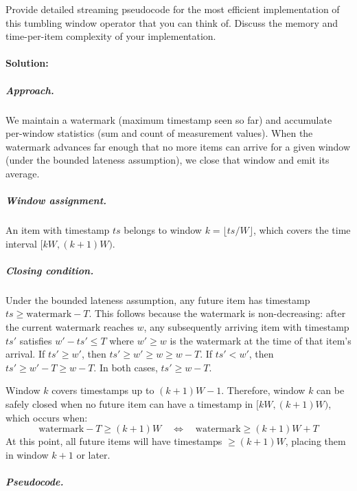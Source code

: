 \documentclass[11pt]{article}
\theoremstyle{definition}
\newcommand{\ts}{\mathit{ts}}
\begin{document}
Provide detailed streaming pseudocode for the most efficient implementation of this tumbling window operator that you can think of. Discuss the memory and time-per-item complexity of your implementation.

\paragraph{Solution:}

\subparagraph{Approach.} We maintain a watermark (maximum timestamp seen so far) and accumulate per-window statistics (sum and count of measurement values). When the watermark advances far enough that no more items can arrive for a given window (under the bounded lateness assumption), we close that window and emit its average.

\subparagraph{Window assignment.} An item with timestamp $\ts$ belongs to window $k = \lfloor \ts / W \rfloor$, which covers the time interval $[kW, (k+1)W)$.

\subparagraph{Closing condition.} Under the bounded lateness assumption, any future item has timestamp $\ts \geq \text{watermark} - T$. This follows because the watermark is non-decreasing: after the current watermark reaches $w$, any subsequently arriving item with timestamp $\ts'$ satisfies $w' - \ts' \leq T$ where $w' \geq w$ is the watermark at the time of that item's arrival. If $\ts' \geq w'$, then $\ts' \geq w' \geq w \geq w - T$. If $\ts' < w'$, then $\ts' \geq w' - T \geq w - T$. In both cases, $\ts' \geq w - T$.

Window $k$ covers timestamps up to $(k+1)W - 1$. Therefore, window $k$ can be safely closed when no future item can have a timestamp in $[kW, (k+1)W)$, which occurs when:
\[
	\text{watermark} - T \geq (k+1)W \quad \Longleftrightarrow \quad \text{watermark} \geq (k+1)W + T
\]
At this point, all future items will have timestamps $\geq (k+1)W$, placing them in window $k+1$ or later.

\subparagraph{Pseudocode.}
\end{document}
